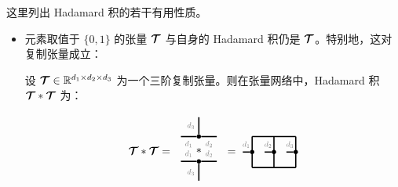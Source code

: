\begin{remark}
这里列出 Hadamard 积的若干有用性质。
\begin{itemize}
    \item 元素取值于 $\{0,1\}$ 的张量 $\bm{\mathcal{T}}$ 与自身的 Hadamard 积仍是 $\bm{\mathcal{T}}$。特别地，这对复制张量成立：
    
    设 $\bm{\mathcal{T}}\in\mathbb{R}^{d_1\times d_2\times d_3}$ 为一个三阶复制张量。则在张量网络中，Hadamard 积 $\bm{\mathcal{T}}*\bm{\mathcal{T}}$ 为：
    $$\Tt\hadam\Tt=
    \begin{tikzpicture}[baseline=\baseline]
   \tikzset{tensor/.style = {minimum size = 0.5cm,shape = circle,thick,draw=black,inner sep = 0pt}, edge/.style = {thick,line width=.4mm},every loop/.style={}}
    \def\y{0.2}
    \def\x{0}
     \draw  node[fill = black,circle,inner sep=0pt,minimum size=4pt] (m) at (\x,\y-0.5) {};
     \draw  node[draw=none] (a) at (\x-0.7,\y-0.5) {};
     \draw  node[draw=none] (b) at (\x+0.7,\y-0.5) {};
     \draw  node[draw=none] (c) at (\x,\y-1.25) {};
    \draw[edge] (a) -- (m) node [midway,above] {\scalebox{0.7}{\dimcolor{$d_1$}}};
    \draw[edge] (m) -- (b)node [midway,above] {\scalebox{0.7}{\dimcolor{$d_2$}}};
    \draw[edge] (m) -- (c)node [midway,left] {\scalebox{0.7}{\dimcolor{$d_3$}}};
    \draw  node[fill = black,circle,inner sep=0pt,minimum size=4pt] (m1) at (\x,\y+0.3) {};
     \draw  node[draw=none] (d) at (\x-0.7,\y+0.3) {};
     \draw  node[draw=none] (e) at (\x+0.7,\y+0.3) {};
     \draw  node[draw=none] (f) at (\x,\y+1.05) {};
    \draw[edge] (d) -- (m1)node [midway,below] {\scalebox{0.7}{\dimcolor{$d_1$}}};
    \draw[edge] (m1) -- (e)node [midway,below] {\scalebox{0.7}{\dimcolor{$d_2$}}};
    \draw[edge] (m1) -- (f)node [midway,left] {\scalebox{0.7}{\dimcolor{$d_3$}}};
    \node[draw=none] at (\x,\y-0.15){$\hadam$};
\end{tikzpicture}
=
    \begin{tikzpicture}[baseline=\baseline]
   \tikzset{tensor/.style = {minimum size = 0.5cm,shape = circle,thick,draw=black,inner sep = 0pt}, edge/.style = {thick,line width=.4mm},every loop/.style={}}
    \def\y{0}
    \def\x{0}
    \draw[edge](\x-0.7,\y-0.5)--(\x+0.7,\y-0.5);
    \draw[edge](\x-0.7,\y+0.5)--(\x+0.7,\y+0.5);
    \draw[edge](\x-0.7,\y-0.5)--(\x-0.7,\y+0.5);
    \draw[edge](\x+0.7,\y-0.5)--(\x+0.7,\y+0.5);
    \draw[edge](\x,\y+0.5) -- (\x,\y-0.5);
     \draw  node[fill = black,circle,inner sep=0pt,minimum size=4pt] (m1) at (\x-0.7,\y) {};
    \draw  node[fill = black,circle,inner sep=0pt,minimum size=4pt] (m) at (\x,\y) {};
    \draw  node[fill = black,circle,inner sep=0pt,minimum size=4pt] (m2) at (\x+0.7,\y) {};
    \draw[edge](m1)--(\x-1,\y)node [midway,above] {\scalebox{0.7}{\dimcolor{$d_1$}}};
    \draw[edge](m2)--(\x+0.4,\y)node [midway,above] {\scalebox{0.7}{\dimcolor{$d_3$}}};
    \draw[edge](m)--(\x-0.3,\y)node [midway,above] {\scalebox{0.7}{\dimcolor{$d_2$}}};
     \end{tikzpicture}$$
    

\end{itemize}
\end{remark}
